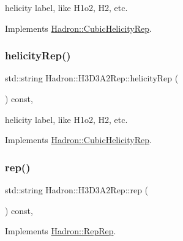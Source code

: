 helicity label, like H1o2, H2, etc. 

Implements \mbox{\hyperlink{structHadron_1_1CubicHelicityRep_af1096946b7470edf0a55451cc662f231}{Hadron\+::\+Cubic\+Helicity\+Rep}}.

\mbox{\label{structHadron_1_1H3D3A2Rep_adb8dca7dffaed3e2601a160205d6d23c}} 
\subsubsection{\texorpdfstring{helicityRep()}{helicityRep()}\hspace{0.1cm}{\footnotesize\ttfamily [2/2]}}
{\footnotesize\ttfamily std\+::string Hadron\+::\+H3\+D3\+A2\+Rep\+::helicity\+Rep (\begin{DoxyParamCaption}{ }\end{DoxyParamCaption}) const\hspace{0.3cm}{\ttfamily [inline]}, {\ttfamily [virtual]}}

helicity label, like H1o2, H2, etc. 

Implements \mbox{\hyperlink{structHadron_1_1CubicHelicityRep_af1096946b7470edf0a55451cc662f231}{Hadron\+::\+Cubic\+Helicity\+Rep}}.

\mbox{\label{structHadron_1_1H3D3A2Rep_a2634fb1518fc2bc1d80d435e4e83aff3}} 
\subsubsection{\texorpdfstring{rep()}{rep()}\hspace{0.1cm}{\footnotesize\ttfamily [1/3]}}
{\footnotesize\ttfamily std\+::string Hadron\+::\+H3\+D3\+A2\+Rep\+::rep (\begin{DoxyParamCaption}{ }\end{DoxyParamCaption}) const\hspace{0.3cm}{\ttfamily [inline]}, {\ttfamily [virtual]}}



Implements \mbox{\hyperlink{structHadron_1_1RepRep_ab3213025f6de249f7095892109575fde}{Hadron\+::\+Rep\+Rep}}.

\mbox{\label{structHadron_1_1H3D3A2Rep_a2634fb1518fc2bc1d80d435e4e83aff3}} 
